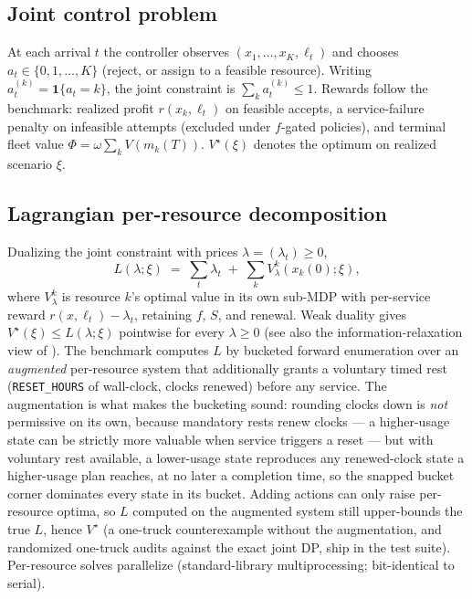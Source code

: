 \documentclass[11pt]{article}
\newcommand{\Vstar}{V^{\star}}
\begin{document}
\subsection{Joint control problem}

At each arrival $t$ the controller observes $(x_1, \dots, x_K, \ell_t)$
and chooses $a_t \in \{0, 1, \dots, K\}$ (reject, or assign to a
feasible resource). Writing $a^{(k)}_t = \mathbf{1}\{a_t = k\}$, the
joint constraint is $\sum_k a^{(k)}_t \leq 1$. Rewards follow the
benchmark: realized profit $r(x_k, \ell_t)$ on feasible accepts, a
service-failure penalty on infeasible attempts (excluded under
$f$-gated policies), and terminal fleet value
$\Phi = \omega \sum_k V(m_k(T))$. $\Vstar(\xi)$ denotes the optimum on
realized scenario $\xi$.

\subsection{Lagrangian per-resource decomposition}
\label{sec:lagrangian}

Dualizing the joint constraint with prices
$\lambda = (\lambda_t) \geq 0$,
\begin{equation}
  L(\lambda; \xi) \;=\; \sum_t \lambda_t
  \;+\; \sum_k V^k_{\lambda}(x_k(0); \xi),
  \label{eq:lag}
\end{equation}
where $V^k_{\lambda}$ is resource $k$'s optimal value in its own sub-MDP
with per-service reward $r(x, \ell_t) - \lambda_t$, retaining $f$, $S$,
and renewal. Weak duality gives $\Vstar(\xi) \leq L(\lambda; \xi)$
pointwise for every $\lambda \geq 0$ (see also the
information-relaxation view of \citealp{brown2010information}). The benchmark computes $L$ by
bucketed forward enumeration over an \emph{augmented} per-resource
system that additionally grants a voluntary timed rest
(\texttt{RESET\_HOURS} of wall-clock, clocks renewed) before any
service. The augmentation is what makes the bucketing sound: rounding
clocks down is \emph{not} permissive on its own, because mandatory
rests renew clocks --- a higher-usage state can be strictly more
valuable when service triggers a reset --- but with voluntary rest
available, a lower-usage state reproduces any renewed-clock state a
higher-usage plan reaches, at no later a completion time, so the
snapped bucket corner dominates every state in its bucket. Adding
actions can only raise per-resource optima, so $L$ computed on the
augmented system still upper-bounds the true $L$, hence $\Vstar$
(a one-truck counterexample without the augmentation, and randomized
one-truck audits against the exact joint DP, ship in the test suite).
Per-resource solves
parallelize (standard-library multiprocessing; bit-identical to serial).
\end{document}
